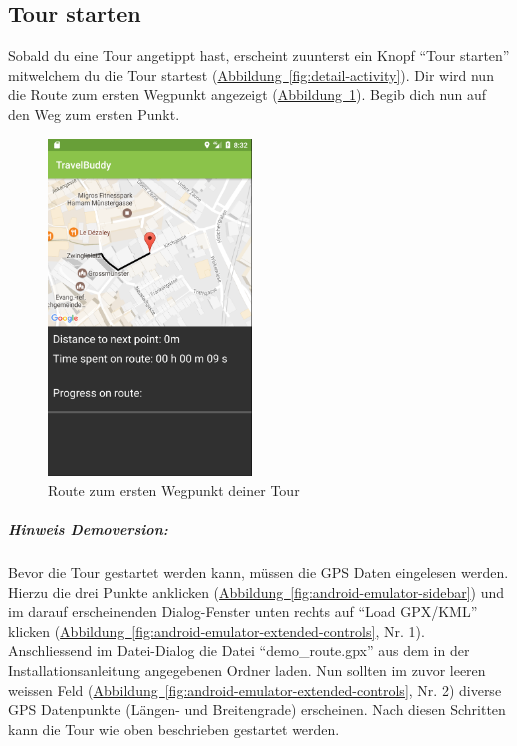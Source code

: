 \documentclass[a4paper,10pt,xetex]{article}
\begin{document}
\subsection{Tour starten}

Sobald du eine Tour angetippt hast, erscheint zuunterst ein Knopf ``Tour starten''
mitwelchem du die Tour startest (\hyperref[fig:detail-activity]{Abbildung~\ref*{fig:detail-activity}}).
Dir wird nun die Route zum ersten Wegpunkt angezeigt (\hyperref[fig:tour-activity]{Abbildung~\ref*{fig:tour-activity}}).
Begib dich nun auf den Weg zum ersten Punkt.

\begin{figure}
  \centering
  \includegraphics[width=0.48\textwidth]{screenshots/TourActivityStart}
  \caption{Route zum ersten Wegpunkt deiner Tour}
  \label{fig:tour-activity}
\end{figure}

\subparagraph{Hinweis Demoversion:}
Bevor die Tour gestartet werden kann, müssen die GPS Daten eingelesen werden. Hierzu
die drei Punkte anklicken (\hyperref[fig:android-emulator-sidebar]{Abbildung~\ref*{fig:android-emulator-sidebar}})
und im darauf erscheinenden Dialog-Fenster unten rechts auf ``Load GPX/KML'' klicken
(\hyperref[fig:android-emulator-extended-controls]{Abbildung~\ref*{fig:android-emulator-extended-controls}}, Nr. 1).
Anschliessend im Datei-Dialog die Datei ``demo\_route.gpx'' aus dem in der
Installationsanleitung angegebenen Ordner laden. Nun sollten im zuvor leeren
weissen Feld (\hyperref[fig:android-emulator-extended-controls]{Abbildung~\ref*{fig:android-emulator-extended-controls}}, Nr. 2)
diverse GPS Datenpunkte (Längen- und Breitengrade) erscheinen. Nach diesen
Schritten kann die Tour wie oben beschrieben gestartet werden.
\end{document}
